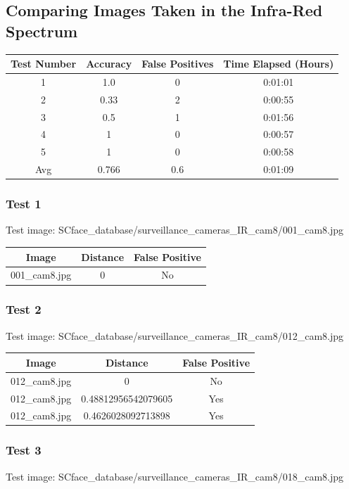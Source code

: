 \documentclass[12pt]{article}
\begin{document}
\subsection{Comparing Images Taken in the Infra-Red Spectrum}
\begin{center}
\begin{tabular}{cccc}
Test Number & Accuracy & False Positives & Time Elapsed (Hours) \\
\hline
1 & 1.0 & 0 & 0:01:01\\
2 & 0.33 & 2 & 0:00:55\\
3 & 0.5 & 1 & 0:01:56\\
4 & 1 & 0 & 0:00:57\\
5 & 1 & 0 & 0:00:58\\
Avg & 0.766 & 0.6 & 0:01:09 \\ 
\end{tabular}
\end{center}

\subsubsection{Test 1}
Test image: SCface\_database/surveillance\_cameras\_IR\_cam8/001\_cam8.jpg

\begin{center}
\begin{tabular}{ccc}
Image & Distance & False Positive \\
\hline
001\_cam8.jpg & 0 & No \\
\end{tabular}
\end{center}

\subsubsection{Test 2}
Test image: SCface\_database/surveillance\_cameras\_IR\_cam8/012\_cam8.jpg

\begin{center}
\begin{tabular}{ccc}
Image & Distance & False Positive \\
\hline
012\_cam8.jpg & 0 & No \\
012\_cam8.jpg & 0.48812956542079605 & Yes \\
012\_cam8.jpg & 0.4626028092713898 & Yes \\
\end{tabular}
\end{center}

\subsubsection{Test 3}
Test image: SCface\_database/surveillance\_cameras\_IR\_cam8/018\_cam8.jpg
\end{document}
